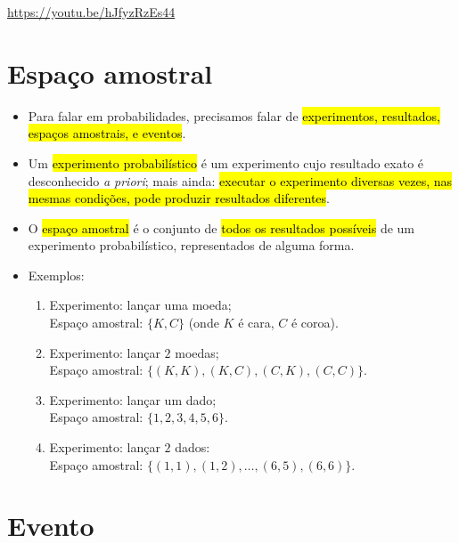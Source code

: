 \documentclass[
  11pt]{report}
\begin{document}
\begin{center} \url{https://youtu.be/hJfyzRzEs44} \end{center}

\hypertarget{espauxe7o-amostral}{%
\section{Espaço amostral}\label{espauxe7o-amostral}}

\begin{itemize}
\item
  Para falar em probabilidades, precisamos falar de {\hl{experimentos, resultados, espaços amostrais, e eventos}}.
\item
  Um {\hl{experimento probabilístico}} é um experimento cujo resultado exato é desconhecido \emph{a priori}; mais ainda: {\hl{executar o experimento diversas vezes, nas mesmas condições, pode produzir resultados diferentes}}.
\item
  O {\hl{espaço amostral}} é o conjunto de {\hl{todos os resultados possíveis}} de um experimento probabilístico, representados de alguma forma.
\item
  Exemplos:

  \begin{enumerate}
  \def\labelenumi{\arabic{enumi}.}
  \item
    Experimento: lançar uma moeda;\\
    Espaço amostral: $\{ K, C \}$ (onde $K$ é cara, $C$ é coroa).
  \item
    Experimento: lançar $2$ moedas;\\
    Espaço amostral: $\{ (K,K), (K,C), (C,K), (C,C) \}$.
  \item
    Experimento: lançar um dado;\\
    Espaço amostral: $\{ 1, 2, 3, 4, 5, 6 \}$.
  \item
    Experimento: lançar $2$ dados:\\
    Espaço amostral: $\{ (1, 1), (1, 2), \ldots, (6, 5), (6, 6) \}$.
  \end{enumerate}
\end{itemize}

\hypertarget{evento}{%
\section{Evento}\label{evento}}
\end{document}
